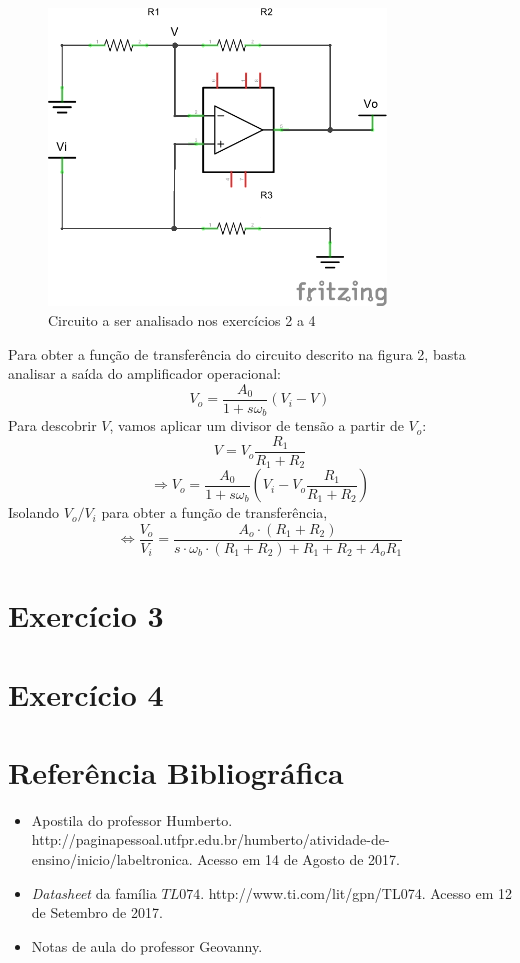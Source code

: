 \documentclass[12pt, a4paper, twoside]{article}
\begin{document}
\begin{figure}
    \centering
    \includegraphics[width=0.8\textwidth]{figs/rel2/ex2.png}
    \caption{Circuito a ser analisado nos exercícios 2 a 4}
\end{figure}

Para obter a função de transferência do circuito descrito na figura 2, basta analisar a saída do amplificador operacional:
$$ V_o = \frac{A_0}{1+s \omega_b}(V_i-V) $$
Para descobrir $V$, vamos aplicar um divisor de tensão a partir de $V_o$:
$$ V = V_o \frac{R_1}{R_1 + R_2} $$
$$ \Rightarrow V_o = \frac{A_0}{1+s \omega_b} \left(V_i - V_o \frac{R_1}{R_1 + R_2} \right) $$
Isolando $V_o/V_i$ para obter a função de transferência,
$$ \Leftrightarrow \frac{V_o}{V_i} = \frac{A_o\cdotp(R_1 + R_2)}{s\cdotp\omega_b\cdotp(R_1+R_2)+R_1+R_2+A_oR_1} $$

\section{Exercício 3}

\section{Exercício 4}


\section{Referência Bibliográfica}

\begin{itemize}
    \item Apostila do professor Humberto. http://paginapessoal.utfpr.edu.br/humberto/atividade-de-ensino/inicio/labeltronica. Acesso em 14 de Agosto de 2017.
    \item \textit{Datasheet} da família $TL074$. http://www.ti.com/lit/gpn/TL074. Acesso em 12 de Setembro de 2017.
    \item Notas de aula do professor Geovanny.
\end{itemize}
\end{document}
